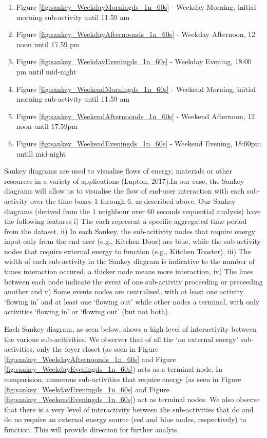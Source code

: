 \documentclass[11pt,]{article}
\providecommand{\tightlist}{%
  \setlength{\itemsep}{0pt}\setlength{\parskip}{0pt}}
\begin{document}
\begin{enumerate}
\def\labelenumi{\arabic{enumi}.}
\tightlist
\item
  Figure \ref{fig:sankey_WeekdayMorningds_1n_60s} - Weekday Morning,
  initial morning sub-activity until 11.59 am
\item
  Figure \ref{fig:sankey_WeekdayAfternoonds_1n_60s} - Weekday Afternoon,
  12 noon until 17.59 pm
\item
  Figure \ref{fig:sankey_WeekdayEveningds_1n_60s} - Weekday Evening,
  18:00 pm until mid-night
\item
  Figure \ref{fig:sankey_WeekendMorningds_1n_60s} - Weekend Morning,
  initial morning sub-activity until 11.59 am
\item
  Figure \ref{fig:sankey_WeekendAfternoonds_1n_60s} - Weekend Afternoon,
  12 noon until 17.59pm
\item
  Figure \ref{fig:sankey_WeekendEveningds_1n_60s} - Weekend Evening,
  18:00pm untill mid-night
\end{enumerate}

Sankey diagrams are used to visualise flows of energy, materials or
other resources in a variety of applications (Lupton, 2017).In our case,
the Sankey diagrams will allow us to visualise the flow of end-user
interaction with each sub-activity over the time-boxes 1 through 6, as
described above. Our Sankey diagrams (derived from the 1 neighbour over
60 seconds sequential analysis) have the following features i) The each
represent a specific aggregated time period from the dataset, ii) In
each Sankey, the sub-acitivity nodes that require energy input only from
the end user (e.g., Kitchen Door) are blue, while the sub-activity nodes
that require external energy to function (e.g., Kitchen Toaster), iii)
The width of each sub-activity in the Sankey diagram is indicative to
the number of times interaction occured, a thicker node means more
interaction, iv) The lines between each node indicate the event of one
sub-activity proceeding or preceeding another and v) Some events nodes
are centralised, with at least one activity `flowing in' and at least
one `flowing out' while other nodes a terminal, with only activities
`flowing in' or `flowing out' (but not both).

Each Sankey diagram, as seen below, shows a high level of interactivity
between the various sub-acitivities. We observer that of all the `no
external energy' sub-activities, only the foyer closet (as seen in
Figure \ref{fig:sankey_WeekdayAfternoonds_1n_60s} and Figure
\ref{fig:sankey_WeekdayEveningds_1n_60s}) acts as a terminal node. In
comparision, numerous sub-activities that require energy (as seen in
Figure \ref{fig:sankey_WeekdayEveningds_1n_60s} and Figure
\ref{fig:sankey_WeekendEveningds_1n_60s}) act as terminal nodes. We also
observe that there is a very level of interactivity between the
sub-activities that do and do no require an external energy source (red
and blue nodes, respectively) to function. This will provide direction
for further analyis.
\end{document}
